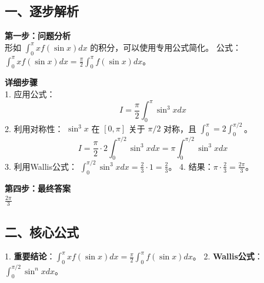 \documentclass[12pt, a4paper]{ctexart}
\newenvironment{RedAnalysis}{
    \par
    \color{red} %
}{
    \par
    \color{black} %
}
\begin{document}
\begin{RedAnalysis}

\subsection*{一、逐步解析}

\textbf{第一步：问题分析} \\
形如 $\int_0^{\pi} x f(\sin x) dx$ 的积分，可以使用专用公式简化。
公式：$\int_0^{\pi} x f(\sin x) dx = \frac{\pi}{2} \int_0^{\pi} f(\sin x) dx$。

\textbf{详细步骤} \\
1. 应用公式：
   \[ I = \frac{\pi}{2} \int_0^{\pi} \sin^3 x dx \]
2. 利用对称性：
   $\sin^3 x$ 在 $[0, \pi]$ 关于 $\pi/2$ 对称，且 $\int_0^{\pi} = 2\int_0^{\pi/2}$。
   \[ I = \frac{\pi}{2} \cdot 2 \int_0^{\pi/2} \sin^3 x dx = \pi \int_0^{\pi/2} \sin^3 x dx \]
3. 利用Wallis公式：
   $\int_0^{\pi/2} \sin^3 x dx = \frac{2}{3} \cdot 1 = \frac{2}{3}$。
4. 结果：$\pi \cdot \frac{2}{3} = \frac{2\pi}{3}$。

\textbf{第四步：最终答案} \\
$ \frac{2\pi}{3} $

\subsection*{二、核心公式}
1. \textbf{重要结论}：$\int_0^{\pi} x f(\sin x) dx = \frac{\pi}{2} \int_0^{\pi} f(\sin x) dx$。
2. \textbf{Wallis公式}：$\int_0^{\pi/2} \sin^n x dx$。

\end{RedAnalysis}
\end{document}
